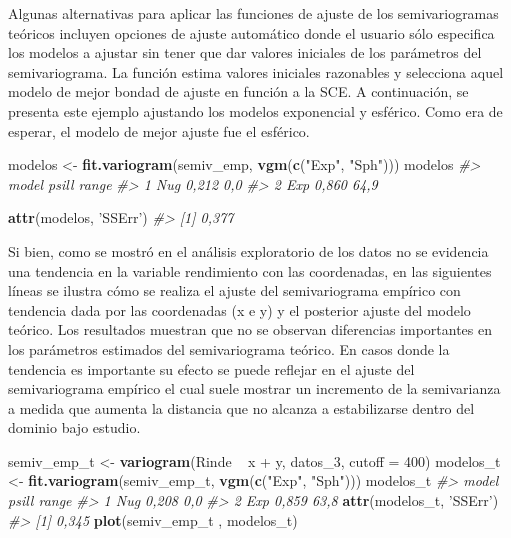 \documentclass[11pt,b5paper,]{krantz}
\newenvironment{Shaded}{}{}
\newcommand{\CommentTok}[1]{\textcolor[rgb]{0.38,0.63,0.69}{\textit{#1}}}
\newcommand{\DataTypeTok}[1]{\textcolor[rgb]{0.56,0.13,0.00}{#1}}
\newcommand{\DecValTok}[1]{\textcolor[rgb]{0.25,0.63,0.44}{#1}}
\newcommand{\KeywordTok}[1]{\textcolor[rgb]{0.00,0.44,0.13}{\textbf{#1}}}
\newcommand{\NormalTok}[1]{#1}
\newcommand{\OperatorTok}[1]{\textcolor[rgb]{0.40,0.40,0.40}{#1}}
\newcommand{\StringTok}[1]{\textcolor[rgb]{0.25,0.44,0.63}{#1}}
\begin{document}
Algunas alternativas para aplicar las funciones de ajuste de los semivariogramas teóricos incluyen opciones de ajuste automático donde el usuario sólo especifica los modelos a ajustar sin tener que dar valores iniciales de los parámetros del semivariograma. La función estima valores iniciales razonables y selecciona aquel modelo de mejor bondad de ajuste en función a la SCE. A continuación, se presenta este ejemplo ajustando los modelos exponencial y esférico. Como era de esperar, el modelo de mejor ajuste fue el esférico.

\begin{Shaded}
\begin{Highlighting}[]
\NormalTok{modelos <-}\StringTok{ }\KeywordTok{fit.variogram}\NormalTok{(semiv_emp, }
                         \KeywordTok{vgm}\NormalTok{(}\KeywordTok{c}\NormalTok{(}\StringTok{"Exp"}\NormalTok{, }\StringTok{"Sph"}\NormalTok{)))}
\NormalTok{modelos}
\CommentTok{#>   model psill range}
\CommentTok{#> 1   Nug 0,212   0,0}
\CommentTok{#> 2   Exp 0,860  64,9}
\end{Highlighting}
\end{Shaded}

\begin{Shaded}
\begin{Highlighting}[]
\KeywordTok{attr}\NormalTok{(modelos, }\StringTok{'SSErr'}\NormalTok{)}
\CommentTok{#> [1] 0,377}
\end{Highlighting}
\end{Shaded}

Si bien, como se mostró en el análisis exploratorio de los datos no se evidencia una tendencia en la variable rendimiento con las coordenadas, en las siguientes líneas se ilustra cómo se realiza el ajuste del semivariograma empírico con tendencia dada por las coordenadas (x e y) y el posterior ajuste del modelo teórico. Los resultados muestran que no se observan diferencias importantes en los parámetros estimados del semivariograma teórico. En casos donde la tendencia es importante su efecto se puede reflejar en el ajuste del semivariograma empírico el cual suele mostrar un incremento de la semivarianza a medida que aumenta la distancia que no alcanza a estabilizarse dentro del dominio bajo estudio.

\begin{Shaded}
\begin{Highlighting}[]
\NormalTok{semiv_emp_t <-}\StringTok{ }\KeywordTok{variogram}\NormalTok{(Rinde }\OperatorTok{~}\StringTok{ }\NormalTok{x }\OperatorTok{+}\StringTok{ }\NormalTok{y, }
\NormalTok{                         datos_}\DecValTok{3}\NormalTok{, }\DataTypeTok{cutoff =} \DecValTok{400}\NormalTok{)}
\NormalTok{modelos_t <-}\StringTok{ }\KeywordTok{fit.variogram}\NormalTok{(semiv_emp_t, }
                           \KeywordTok{vgm}\NormalTok{(}\KeywordTok{c}\NormalTok{(}\StringTok{"Exp"}\NormalTok{, }\StringTok{"Sph"}\NormalTok{)))}
\NormalTok{modelos_t}
\CommentTok{#>   model psill range}
\CommentTok{#> 1   Nug 0,208   0,0}
\CommentTok{#> 2   Exp 0,859  63,8}
\KeywordTok{attr}\NormalTok{(modelos_t, }\StringTok{'SSErr'}\NormalTok{)}
\CommentTok{#> [1] 0,345}
\KeywordTok{plot}\NormalTok{(semiv_emp_t , modelos_t)}
\end{Highlighting}
\end{Shaded}
\end{document}
